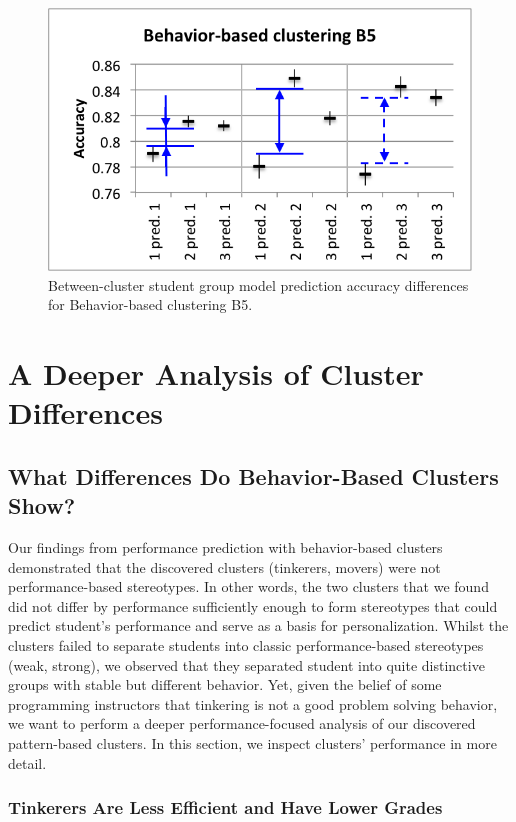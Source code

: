 \documentclass{sigchi}
\begin{document}
\begin{figure}[thb]
\centering
   \includegraphics[width=0.7\columnwidth]{figures/behavior_clust_B5.png}
\caption{Between-cluster student group model prediction accuracy differences for Behavior-based clustering B5.}%
\label{fig:graph-clusters-B5}
\end{figure}

\section{A Deeper Analysis of Cluster Differences}

\subsection{What Differences Do Behavior-Based Clusters Show?}

Our findings from performance prediction with behavior-based clusters demonstrated that the discovered clusters (tinkerers, movers) were not performance-based stereotypes. In other words, the two clusters that we found did not differ by performance sufficiently enough to form stereotypes that could predict student's performance and serve as a basis for personalization. Whilst the clusters failed to separate students into classic performance-based stereotypes (weak, strong), we observed that they separated student into quite distinctive groups with stable but different behavior. Yet, given the belief of some programming instructors that tinkering is not a good problem solving behavior, we want to perform a deeper performance-focused analysis of our discovered pattern-based clusters. In this section, we inspect clusters' performance in more detail. 

\subsubsection{Tinkerers Are Less Efficient and Have Lower Grades}
\end{document}
